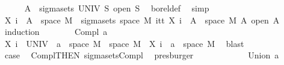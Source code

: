 \begin{isabellebody}
\ \ \ \ \isamarkupfalse%
\ {\isachardoublequoteopen}A\ {\isasymin}\ sigma{\isacharunderscore}{\kern0pt}sets\ UNIV\ {\isacharbraceleft}{\kern0pt}S{\isachardot}{\kern0pt}\ open\ S{\isacharbraceright}{\kern0pt}{\isachardoublequoteclose}\ \isamarkupfalse%
\ borel{\isacharunderscore}{\kern0pt}def\ \isamarkupfalse%
\ simp\isanewline
\ \ \ \ \isamarkupfalse%
\ {\isachardoublequoteopen}X\ i\ {\isacharminus}{\kern0pt}{\isacharbackquote}{\kern0pt}\ A\ {\isasyminter}\ space\ M\ {\isasymin}\ sigma{\isacharunderscore}{\kern0pt}sets\ {\isacharparenleft}{\kern0pt}space\ M{\isacharparenright}{\kern0pt}\ {\isacharparenleft}{\kern0pt}{\isasymUnion}i{\isasymin}{\isacharbraceleft}{\kern0pt}tt{\isacharbraceright}{\kern0pt}{\isachardot}{\kern0pt}\ {\isacharbraceleft}{\kern0pt}X\ i\ {\isacharminus}{\kern0pt}{\isacharbackquote}{\kern0pt}\ A\ {\isasyminter}\ space\ M\ {\isacharbar}{\kern0pt}A{\isachardot}{\kern0pt}\ open\ A{\isacharbraceright}{\kern0pt}{\isacharparenright}{\kern0pt}{\isachardoublequoteclose}\isanewline
\ \ \ \ \isamarkupfalse%
\ {\isacharparenleft}{\kern0pt}induction{\isacharparenright}{\kern0pt}\isanewline
\ \ \ \ \ \ \isamarkupfalse%
\ {\isacharparenleft}{\kern0pt}Compl\ a{\isacharparenright}{\kern0pt}\isanewline
\ \ \ \ \ \ \isamarkupfalse%
\ {\isachardoublequoteopen}X\ i\ {\isacharminus}{\kern0pt}{\isacharbackquote}{\kern0pt}\ {\isacharparenleft}{\kern0pt}UNIV\ {\isacharminus}{\kern0pt}\ a{\isacharparenright}{\kern0pt}\ {\isasyminter}\ space\ M\ {\isacharequal}{\kern0pt}\ space\ M\ {\isacharminus}{\kern0pt}\ {\isacharparenleft}{\kern0pt}X\ i\ {\isacharminus}{\kern0pt}{\isacharbackquote}{\kern0pt}\ a\ {\isasyminter}\ space\ M{\isacharparenright}{\kern0pt}{\isachardoublequoteclose}\ \isamarkupfalse%
\ blast\isanewline
\ \ \ \ \ \ \isamarkupfalse%
\ \isamarkupfalse%
\ {\isacharquery}{\kern0pt}case\ \isamarkupfalse%
\ Compl{\isacharparenleft}{\kern0pt}{}{\isacharparenright}{\kern0pt}{\isacharbrackleft}{\kern0pt}THEN\ sigma{\isacharunderscore}{\kern0pt}sets{\isachardot}{\kern0pt}Compl{\isacharbrackright}{\kern0pt}\ \isamarkupfalse%
\ presburger\isanewline
\ \ \ \ \isamarkupfalse%
\isanewline
\ \ \ \ \ \ \isamarkupfalse%
\ {\isacharparenleft}{\kern0pt}Union\ a{\isacharparenright}{\kern0pt}\isanewline
\ \ \ \ \ \ \isamarkupfalse%

\end{isabellebody}
